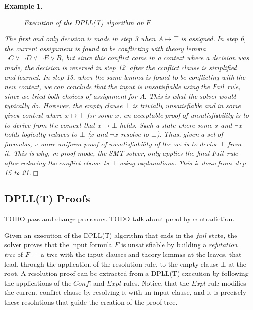 \documentclass[11pt]{article}
\newtheorem{example}{Example}[section]
\begin{document}
\begin{example}
\begin{figure}[t]
			\caption{Execution of the DPLL(T) algorithm on $F$}
			\label{fig:dplltex}
		\end{figure}
		The first and only decision is made in 
		step 3 when $A \mapsto \top$ is assigned.
		In step 6, the current assignment is 
		found to be conflicting with theory
		lemma $\neg C \lor \neg D \lor \neg E
		\lor B$, but since this conflict 
		came in a context where a decision
		was made, the decision is reversed
		in step 12, after the conflict clause 
		is simplified and learned. In step 15, 
		when the same lemma is found to be 
		conflicting with the new context, we 
		can conclude that the input is 
		unsatisfiable using the $\mathit{Fail}$ rule, 
		since we tried both choices of 
		assignment for $A$. This is what 
		the solver would typically do. However, 
		the empty clause $\bot$ 
		is trivially unsatisfiable and in 
		some given context where 
		$x \mapsto \top$ for some $x$, an 
		acceptable proof of unsatisfiability 
		is to to derive from the context that 
		$x \mapsto \bot$ holds. Such a state 
		where some $x$ and $\neg x$ holds
		logically reduces to $\bot$ 
		($x$ and $\neg x$ resolve to $\bot$).
		Thus, given a set of formulas,
		a more uniform proof of 
		unsatisfiability of the set is 
		to derive $\bot$ from it. This is why, 
		in proof mode, the SMT solver, only 
		applies the final $\mathit{Fail}$ rule after 
		reducing the conflict clause to $\bot$
		using explanations. This is done 
		from step 15 to 21.\hfill$\Box$
	\end{example}
	
	\subsection{DPLL(T) Proofs}
	\label{sec:proofex}
	TODO pass and change pronouns. TODO talk about proof by contradiction.
	
	Given an execution of the DPLL(T)
	algorithm that ends in the $fail$ state, 
	the solver proves that the input formula 
	$F$ is unsatisfiable by building a 
	\textit{refutation tree} of $F$ --- a 
	tree with the input clauses 
	and theory lemmas at the leaves, 
	that lead, through the application of 
	the resolution rule, to the empty 
	clause $\bot$ at the root. A
	resolution proof can be extracted 
	from a DPLL(T) execution
	by following the applications of 
	the $\mathit{Confl}$ and 
	$\mathit{Expl}$ rules. Notice, that
	the $\mathit{Expl}$ rule 
	modifies the current conflict clause by 
	resolving it with an input clause, and 
	it is precisely these resolutions 
	that guide the creation of the proof tree.
	
\end{document}
